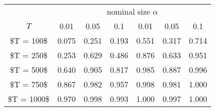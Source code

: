 % 
\begin{tabular}{ccccccc}
  \hline
  & \multicolumn{6}{c}{nominal size $\alpha$} \\
 $T$ & 0.01 & 0.05 & 0.1 & 0.01 & 0.05 & 0.1 \\
 \hline
\$T = 100\$ & 0.075 & 0.251 & 0.193 & 0.551 & 0.317 & 0.714 \\ 
  \$T = 250\$ & 0.253 & 0.629 & 0.486 & 0.876 & 0.633 & 0.951 \\ 
  \$T = 500\$ & 0.640 & 0.905 & 0.817 & 0.985 & 0.887 & 0.996 \\ 
  \$T = 750\$ & 0.867 & 0.982 & 0.957 & 0.998 & 0.981 & 1.000 \\ 
  \$T = 1000\$ & 0.970 & 0.998 & 0.993 & 1.000 & 0.997 & 1.000 \\ 
   \hline
\end{tabular}
